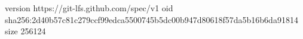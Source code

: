 version https://git-lfs.github.com/spec/v1
oid sha256:2d40b57c81c279ccf99edca5500745b5dc00b947d80618f57da5b16b6da91814
size 256124
